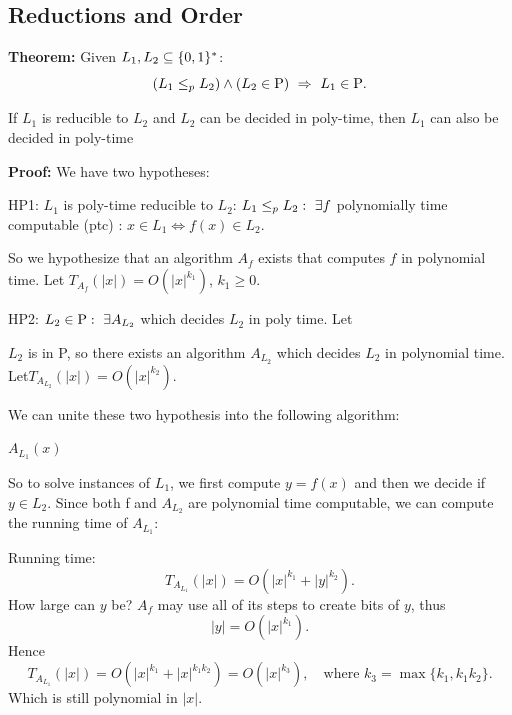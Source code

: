 
\subsection{Reductions and Order}
\begin{notestheorem}
\textbf{Theorem:}
Given $L_1,L_2\subseteq\{0,1\}^*$:
\[
(L_1\polyred L_2)\land(L_2\in\classP)\ \Rightarrow\ L_1\in\classP.
\]

If $L_1$ is reducible to $L_2$ and $L_2$ can be decided in poly-time, then $L_1$ can also be decided in poly-time
\end{notestheorem}

\textbf{Proof:} We have two hypotheses:

HP1: $L_1$ is poly-time reducible to $L_2$:
$L_1\leq_p L_2:\ \exists f$ polynomially time computable (ptc) : $x\in L_1\Longleftrightarrow f(x)\in L_2$.

So we hypothesize that an algorithm $A_f$ exists that computes $f$ in polynomial time. Let $T_{A_f}(|x|)=O(|x|^{k_1})$, $k_1\geq0$.

HP2:
$L_2\in\mathrm{P}:\ \exists A_{L_2}$ which decides $L_2$ in poly time. Let

$L_2$ is in P, so there exists an algorithm $A_{L_2}$ which decides $L_2$ in polynomial time. Let$T_{A_{L_2}}(|x|)=O(|x|^{k_2})$.

We can unite these two hypothesis into the following algorithm:

\begin{notesalgorithm}
\textbf{$A_{L_1}(x)$}
\begin{notespseudocode}
\end{notespseudocode}
\end{notesalgorithm}

So to solve instances of $L_1$, we first compute $y=f(x)$ and then we decide if $y\in L_2$. Since both f and $A_{L_2}$ are polynomial time computable, we can compute the running time of $A_{L_1}$:

Running time:
\[
T_{A_{L_1}}(|x|)=O(|x|^{k_1}+|y|^{k_2}).
\]
How large can $y$ be? $A_f$ may use all of its steps to create bits of $y$, thus
\[
|y|=O(|x|^{k_1}).
\]
Hence
\[
T_{A_{L_1}}(|x|)=O(|x|^{k_1}+|x|^{k_1k_2})=O(|x|^{k_3}),
\quad \text{where } k_3=\max\{k_1, k_1k_2\}.
\]
Which is still polynomial in $|x|$.
